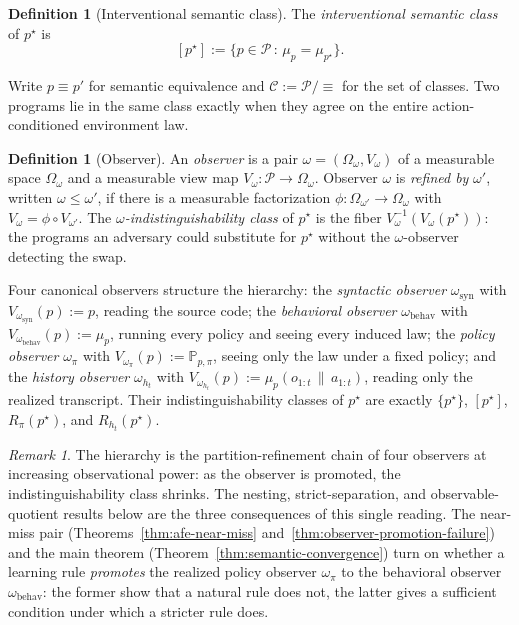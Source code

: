 \documentclass[11pt]{article}
\theoremstyle{definition}
\newtheorem{definition}[theorem]{Definition}
\theoremstyle{remark}
\newtheorem{remark}[theorem]{Remark}
\newcommand{\Ccal}{\mathcal{C}}
\newcommand{\Pcal}{\mathcal{P}}
\newcommand{\Prob}{\mathbb{P}}
\newcommand{\givena}{\,\|\,}
\begin{document}
\begin{definition}[Interventional semantic class]
\label{def:int-sem-class}
The \emph{interventional semantic class} of $p^\star$ is
\[
[p^\star]
:=
\bigl\{p\in\Pcal\,:\,\mu_p=\mu_{p^\star}\bigr\}.
\]
\end{definition}

Write $p\equiv p'$ for semantic equivalence and $\Ccal:=\Pcal/\!\equiv$ for the set of classes. Two programs lie in the same class exactly when they agree on the entire action-conditioned environment law.

\begin{definition}[Observer]
\label{def:observer}
An \emph{observer} is a pair $\omega=(\Omega_\omega,V_\omega)$ of a measurable space $\Omega_\omega$ and a measurable view map $V_\omega:\Pcal\to\Omega_\omega$. Observer $\omega$ is \emph{refined by} $\omega'$, written $\omega\le\omega'$, if there is a measurable factorization $\phi:\Omega_{\omega'}\to\Omega_\omega$ with $V_\omega=\phi\circ V_{\omega'}$. The \emph{$\omega$-indistinguishability class} of $p^\star$ is the fiber $V_\omega^{-1}(V_\omega(p^\star))$: the programs an adversary could substitute for $p^\star$ without the $\omega$-observer detecting the swap.
\end{definition}

Four canonical observers structure the hierarchy: the \emph{syntactic observer} $\omega_{\mathrm{syn}}$ with $V_{\omega_{\mathrm{syn}}}(p):=p$, reading the source code; the \emph{behavioral observer} $\omega_{\mathrm{behav}}$ with $V_{\omega_{\mathrm{behav}}}(p):=\mu_p$, running every policy and seeing every induced law; the \emph{policy observer} $\omega_\pi$ with $V_{\omega_\pi}(p):=\Prob_{p,\pi}$, seeing only the law under a fixed policy; and the \emph{history observer} $\omega_{h_t}$ with $V_{\omega_{h_t}}(p):=\mu_p(o_{1:t}\givena a_{1:t})$, reading only the realized transcript. Their indistinguishability classes of $p^\star$ are exactly $\{p^\star\}$, $[p^\star]$, $R_\pi(p^\star)$, and $R_{h_t}(p^\star)$.

\begin{remark}
\label{rem:four-observers}
The hierarchy is the partition-refinement chain of four observers at increasing observational power: as the observer is promoted, the indistinguishability class shrinks. The nesting, strict-separation, and observable-quotient results below are the three consequences of this single reading. The near-miss pair (Theorems~\ref{thm:afe-near-miss} and~\ref{thm:observer-promotion-failure}) and the main theorem (Theorem~\ref{thm:semantic-convergence}) turn on whether a learning rule \emph{promotes} the realized policy observer $\omega_\pi$ to the behavioral observer $\omega_{\mathrm{behav}}$: the former show that a natural rule does not, the latter gives a sufficient condition under which a stricter rule does.
\end{remark}
\end{document}
